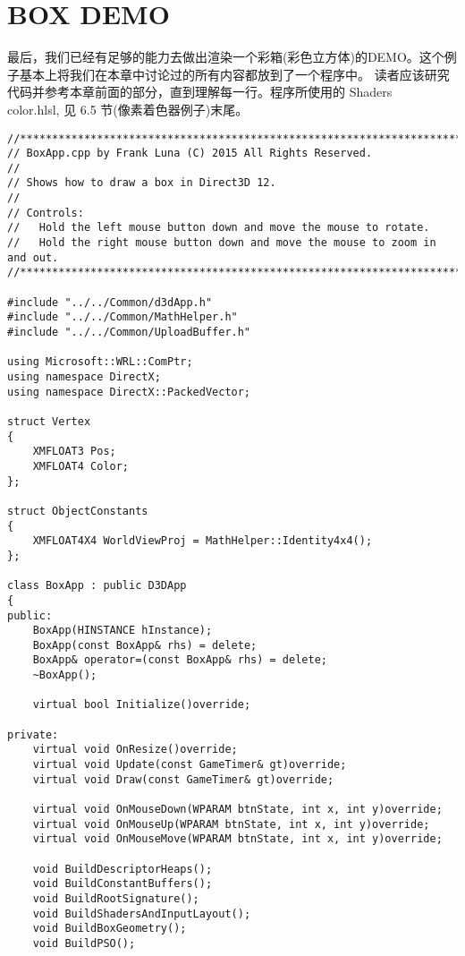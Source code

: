 \section{BOX DEMO}
\begin{flushleft}
最后，我们已经有足够的能力去做出渲染一个彩箱(彩色立方体)的DEMO。这个例子基本上将我们在本章中讨论过的所有内容都放到了一个程序中。 读者应该研究代码并参考本章前面的部分，直到理解每一行。程序所使用的 Shaders\\color.hlsl, 见 6.5 节(像素着色器例子)末尾。
\end{flushleft}
\begin{lstlisting}
//***************************************************************************************
// BoxApp.cpp by Frank Luna (C) 2015 All Rights Reserved.
//
// Shows how to draw a box in Direct3D 12.
//
// Controls:
//   Hold the left mouse button down and move the mouse to rotate.
//   Hold the right mouse button down and move the mouse to zoom in and out.
//***************************************************************************************

#include "../../Common/d3dApp.h"
#include "../../Common/MathHelper.h"
#include "../../Common/UploadBuffer.h"

using Microsoft::WRL::ComPtr;
using namespace DirectX;
using namespace DirectX::PackedVector;

struct Vertex
{
    XMFLOAT3 Pos;
    XMFLOAT4 Color;
};

struct ObjectConstants
{
    XMFLOAT4X4 WorldViewProj = MathHelper::Identity4x4();
};

class BoxApp : public D3DApp
{
public:
    BoxApp(HINSTANCE hInstance);
    BoxApp(const BoxApp& rhs) = delete;
    BoxApp& operator=(const BoxApp& rhs) = delete;
    ~BoxApp();

    virtual bool Initialize()override;

private:
    virtual void OnResize()override;
    virtual void Update(const GameTimer& gt)override;
    virtual void Draw(const GameTimer& gt)override;

    virtual void OnMouseDown(WPARAM btnState, int x, int y)override;
    virtual void OnMouseUp(WPARAM btnState, int x, int y)override;
    virtual void OnMouseMove(WPARAM btnState, int x, int y)override;

    void BuildDescriptorHeaps();
    void BuildConstantBuffers();
    void BuildRootSignature();
    void BuildShadersAndInputLayout();
    void BuildBoxGeometry();
    void BuildPSO();


\end{lstlisting}
